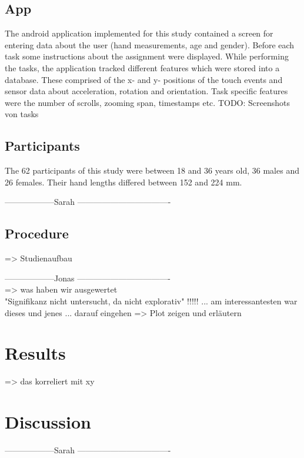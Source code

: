 \documentclass{sigchi}
\begin{document}
\subsection{App}
The android application implemented for this study contained a screen for entering data about the user (hand measurements, age and gender). Before each task some instructions about the assignment were displayed. While performing the tasks, the application tracked different features which were stored into a database. These comprised of the x- and y- positions of the touch events and sensor data about acceleration, rotation and orientation. Task specific features were the number of scrolls, zooming span, timestamps etc. TODO: Screenshots von tasks

\subsection{Participants}
The 62 participants of this study were between 18 and 36 years old, 36 males and 26 females. Their hand lengths differed between 152 and 224 mm.

------------------Sarah ----------------------------------
\subsection{Procedure}
=> Studienaufbau

------------------Jonas ----------------------------------\\
=> was haben wir ausgewertet\\
"Signifikanz nicht untersucht, da nicht explorativ" !!!!! ... am interessantesten war dieses und jenes ... darauf eingehen => Plot zeigen und erläutern

\section{Results}
=> das korreliert mit xy


\section{Discussion}

------------------Sarah ----------------------------------
\end{document}

